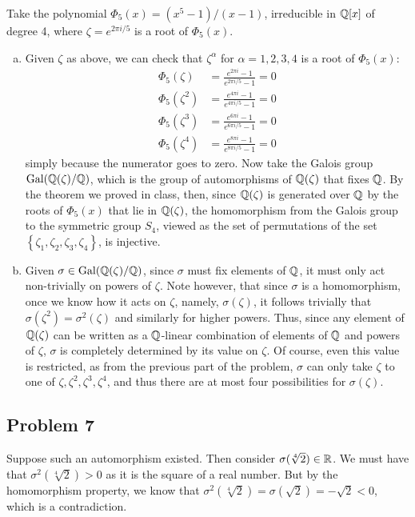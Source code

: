 \documentclass{../../mathnotes}
\begin{document}
Take the polynomial $\Phi_5(x)=(x^5-1)/(x-1)$, irreducible in $\mathbb{Q}[x]$ of degree 4, where $\zeta=e^{2\pi i/5}$ is a root of $\Phi_5(x)$.

\begin{enumerate}[(a)]
    \item Given $\zeta$ as above, we can check that $\zeta^\alpha$ for $\alpha=1,2,3,4$ is a root of $\Phi_5(x)$:
        \begin{align*}
            \Phi_5(\zeta)&=\frac{e^{2\pi i}-1}{e^{2\pi i/5}-1}=0\\
            \Phi_5(\zeta^2)&=\frac{e^{4\pi i}-1}{e^{4\pi i/5}-1}=0\\
            \Phi_5(\zeta^3)&=\frac{e^{6\pi i}-1}{e^{6\pi i/5}-1}=0\\
            \Phi_5(\zeta^4)&=\frac{e^{8\pi i}-1}{e^{8\pi i/5}-1}=0
        \end{align*}
        simply because the numerator goes to zero. Now take the Galois group $\operatorname{Gal}(\mathbb{Q}(\zeta)/\mathbb{Q})$, which is the group
        of automorphisms of $\mathbb{Q}(\zeta)$ that fixes $\mathbb{Q}$. By the theorem we proved in class, then, since $\mathbb{Q}(\zeta)$ is generated
        over $\mathbb{Q}$ by the roots of $\Phi_5(x)$ that lie in $\mathbb{Q}(\zeta)$, the homomorphism from the Galois group to the symmetric
        group $S_4$, viewed as the set of permutations of the set $\left\{ \zeta_1,\zeta_2,\zeta_3,\zeta_4 \right\}$, is injective.
    \item Given $\sigma\in\operatorname{Gal}(\mathbb{Q}(\zeta)/\mathbb{Q})$, since $\sigma$ must fix elements of $\mathbb{Q}$, it must only act non-trivially
        on powers of $\zeta$. Note however, that since $\sigma$ is a homomorphism, once we know how it acts on $\zeta$, namely,
        $\sigma(\zeta)$, it follows trivially that $\sigma(\zeta^2)=\sigma^2(\zeta)$ and similarly for higher powers. Thus, since
        any element of $\mathbb{Q}(\zeta)$ can be written as a $\mathbb{Q}$-linear combination of elements of $\mathbb{Q}$ and powers of $\zeta$, $\sigma$ is
        completely determined by its value on $\zeta$. Of course, even this value is restricted, as from the previous part of the problem,
        $\sigma$ can only take $\zeta$ to one of $\zeta,\zeta^2,\zeta^3,\zeta^4$, and thus there are at most four possibilities
        for $\sigma(\zeta)$.
\end{enumerate}

\subsection*{Problem 7}

Suppose such an automorphism existed.
Then consider $\sigma(\sqrt[4]{2})\in \mathbb{R}$. We must have that $\sigma^2(\sqrt[4]{2})>0$ as it is the square of a real number.
But by the homomorphism property, we know that $\sigma^2(\sqrt[4]{2})=\sigma(\sqrt{2})=-\sqrt{2}<0$, which is a contradiction.
\end{document}
